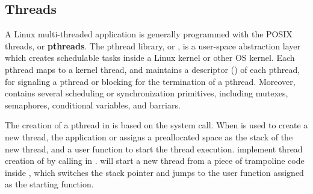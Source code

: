 \subsection{Threads}
\label{sec:libos:thread}


A Linux multi-threaded application
is generally programmed with the POSIX threads, or {\bf pthreads}.
The pthread library, or \libpthread{},
is a user-space abstraction layer
which creates schedulable tasks inside a Linux kernel or other OS kernel.
Each pthread maps to a kernel thread,
and \libpthread{} maintains a descriptor () of each pthread,
for signaling a pthread or blocking for the termination of a pthread.
Moreover,
\libpthread{}contains several scheduling or synchronization primitives, including mutexes, semaphores, conditional variables, and barriars.


The creation of a pthread in \libpthread{} is based on the  system call.
When  is used to create a new thread,
the application or \libpthread{} assigns a preallocated space as the stack of the new thread, and a user function to start the thread execution.
\thelibos{} implement thread creation of  by calling  in \thehostabi{}.
 will start a new thread from a piece of trampoline code inside \thelibos{}, which switches the stack pointer and jumps to the user function assigned as the starting function.









